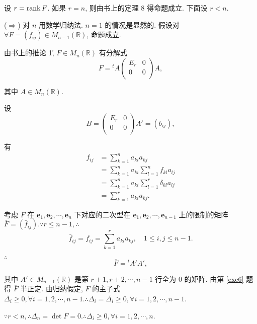 \documentclass{ctexart}
\begin{document}
\begin{solution}
    设 $r=\operatorname{rank} F$. 如果 $r=n$, 则由书上的定理 8 得命题成立. 下面设 $r<n$.

    ($\Rightarrow$) 对 $n$ 用数学归纳法. $n=1$ 的情况是显然的. 假设对 $\forall F=(f_{ij})\in M_{n-1}(\mathbb{R})$, 命题成立.
    
    由书上的推论 1\', $F\in M_n(\mathbb{R})$ 有分解式
    \[F={}^tA\begin{pmatrix}
        E_r & 0 \\
        0 & 0 \\
    \end{pmatrix}A,\]

    其中 $A\in M_n(\mathbb{R})$.
    
    设
    \[B=\begin{pmatrix}
        E_r & 0 \\
        0 & 0 \\
    \end{pmatrix}A'=(b_{ij}),\]
    
    有
    \begin{align*}
        f_{ij} & =\sum\limits_{k=1}^na_{ki}a_{kj} \\
        & =\sum\limits_{k=1}^na_{ki}\sum\limits_{l=1}^nf_{kl}a_{lj} \\
        & =\sum\limits_{k=1}^na_{ki}\sum\limits_{l=1}^r\delta_{kl}a_{lj} \\
        & =\sum\limits_{k=1}^ra_{ki}a_{kj}.
    \end{align*}

    考虑 $F$ 在 $\boldsymbol{e}_1,\boldsymbol{e}_2,\cdots,\boldsymbol{e}_n$ 下对应的二次型在 $\boldsymbol{e}_1,\boldsymbol{e}_2,\cdots,\boldsymbol{e}_{n-1}$ 上的限制的矩阵 $\overline{F}=(\bar{f}_{ij}).\because r\leq n-1,\therefore$
    \[\bar{f}_{ij}=f_{ij}=\sum\limits_{k=1}^ra_{ki}a_{kj},\quad1\leq i,j\leq n-1.\]

    $\therefore$
    \[\overline{F}={}^tA'A',\]

    其中 $A'\in M_{n-1}(\mathbb{R})$ 是第 $r+1,r+2,\cdots,n-1$ 行全为 $0$ 的矩阵. 由第 \ref{exc6} 题得 $\overline{F}$ 半正定. 由归纳假定, $F$ 的主子式 $\overline{\Delta_i}\geq0,\forall i=1,2,\cdots,n-1.\therefore\Delta_i=\overline{\Delta_i}\geq0,\forall i=1,2,\cdots,n-1$.

    $\because r<n,\therefore\Delta_n=\det F=0.\therefore\Delta_i\geq0,\forall i=1,2,\cdots,n$.

    

\end{solution}
\end{document}
